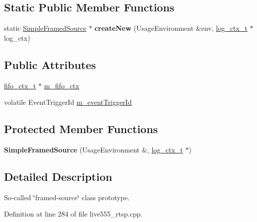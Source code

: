 \subsection*{Static Public Member Functions}
\begin{DoxyCompactItemize}
\item 
static \hyperlink{classSimpleFramedSource}{Simple\+Framed\+Source} $\ast$ {\bfseries create\+New} (Usage\+Environment \&env, \hyperlink{structlog__ctx__s}{log\+\_\+ctx\+\_\+t} $\ast$log\+\_\+ctx)\hypertarget{classSimpleFramedSource_a3c02f3f751c4298e6940b3745c9202ad}{}\label{classSimpleFramedSource_a3c02f3f751c4298e6940b3745c9202ad}

\end{DoxyCompactItemize}
\subsection*{Public Attributes}
\begin{DoxyCompactItemize}
\item 
\hyperlink{structfifo__ctx__s}{fifo\+\_\+ctx\+\_\+t} $\ast$ \hyperlink{classSimpleFramedSource_ab93999240c393d2d3035dc7e5292eb2c}{m\+\_\+fifo\+\_\+ctx}
\item 
volatile Event\+Trigger\+Id \hyperlink{classSimpleFramedSource_a6de7be242a550522e914316487fa112e}{m\+\_\+event\+Trigger\+Id}
\end{DoxyCompactItemize}
\subsection*{Protected Member Functions}
\begin{DoxyCompactItemize}
\item 
{\bfseries Simple\+Framed\+Source} (Usage\+Environment \&, \hyperlink{structlog__ctx__s}{log\+\_\+ctx\+\_\+t} $\ast$)\hypertarget{classSimpleFramedSource_ab1d618908865999c517ad8082657da00}{}\label{classSimpleFramedSource_ab1d618908865999c517ad8082657da00}

\end{DoxyCompactItemize}


\subsection{Detailed Description}
So-\/called \char`\"{}framed-\/source\char`\"{} class prototype. 

Definition at line 284 of file live555\+\_\+rtsp.\+cpp.



